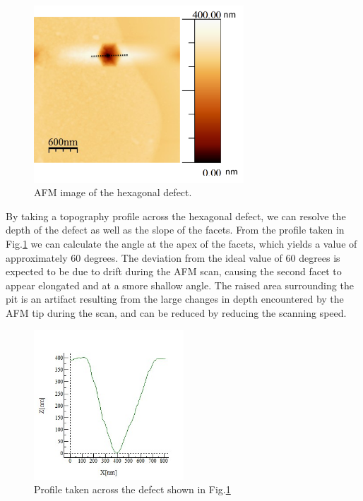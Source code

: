 \begin{figure}[!ht]
	\centering
	\includegraphics[width=0.7\textwidth]{Figs/Ch3/AFM.png}
	\caption[h] {AFM image of the hexagonal defect.}
	\label{afm-pit}
\end{figure}
\FloatBarrier 

By taking a topography profile across the hexagonal defect, we can resolve the depth of the defect as well as the slope of the facets. From the profile taken in Fig.\ref{afm-pit} we can calculate the angle at the apex of the facets, which yields a value of approximately 60 degrees. The deviation from the ideal value of 60 degrees is expected to be due to drift during the AFM scan, causing the second facet to appear elongated and at a smore shallow angle. The raised area surrounding the pit is an artifact resulting from the large changes in depth encountered by the AFM tip during the scan, and can be reduced by reducing the scanning speed.

\begin{figure}[!ht]
	\centering
	\includegraphics[width=0.5\textwidth]{Figs/Ch3/profile}
	\caption[h] {Profile taken across the defect shown in Fig.\ref{afm-pit}}
	\label{profile}
\end{figure}
\FloatBarrier 

